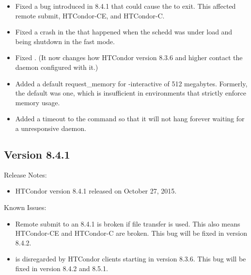 \begin{itemize}
\item Fixed a bug introduced in 8.4.1 that could cause the  to exit.
This affected remote submit, HTCondor-CE, and HTCondor-C.

\item Fixed a crash in the  that happened when the
schedd was under load and being shutdown in the fast mode.

\item Fixed .  (It now changes how HTCondor
version 8.3.6 and higher contact the daemon configured with it.)

\item Added a default request\_memory for  -interactive
of 512 megabytes.  Formerly, the default was one, which is
insufficient in environments that strictly enforce memory
usage.

\item Added a timeout to the  command so that it
will not hang forever waiting for a unresponsive daemon.

\end{itemize}

\subsection*{\label{sec:New-8-4-1}Version 8.4.1}

\noindent Release Notes:

\begin{itemize}

\item HTCondor version 8.4.1 released on October 27, 2015.

\end{itemize}

\noindent Known Issues:
\begin{itemize}
\item Remote submit to an 8.4.1  is broken if file transfer is
used.  This also means HTCondor-CE and HTCondor-C are broken.  This bug will
be fixed in version 8.4.2.

\item {} is disregarded by HTCondor clients
starting in version 8.3.6.  This bug will be fixed in version 8.4.2 and 8.5.1.
\end{itemize}


